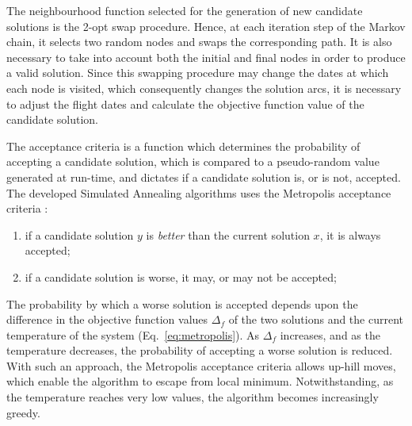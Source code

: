 The neighbourhood function selected for the generation of new candidate solutions is the 2-opt swap procedure. Hence, at each iteration step of the Markov chain, it selects two random nodes and swaps the corresponding path. It is also necessary to take into account both the initial and final nodes in order to produce a valid solution. Since this swapping procedure may change the dates at which each node is visited, which consequently changes the solution arcs, it is necessary to adjust the flight dates and calculate the objective function value of the candidate solution.


The acceptance criteria is a function which determines the probability of accepting a candidate solution, which is compared to a pseudo-random value generated at run-time, and dictates if a candidate solution is, or is not, accepted. The developed Simulated Annealing algorithms uses the Metropolis acceptance criteria \cite{metropolis}: 
\begin{enumerate}
    \item if a candidate solution $y$ is \textit{better} than the current solution $x$, it is always accepted;
    \item if a candidate solution is worse, it may, or may not be accepted;
    
\end{enumerate}

The probability by which a worse solution is accepted depends upon the difference in the objective function values $\Delta_f$ of the two solutions and the current temperature of the system (Eq.~\ref{eq:metropolis}). As $\Delta_f$ increases, and as the temperature decreases, the probability of accepting a worse solution is reduced. With such an approach, the Metropolis acceptance criteria allows up-hill moves, which enable the algorithm to escape from local minimum. Notwithstanding, as the temperature reaches very low values, the algorithm becomes increasingly greedy.

